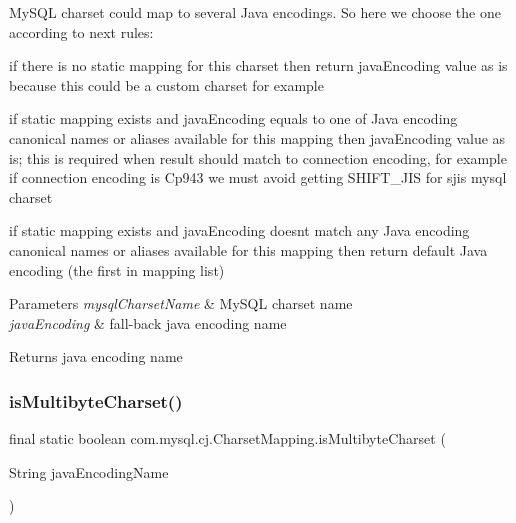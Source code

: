 My\+S\+QL charset could map to several Java encodings. So here we choose the one according to next rules\+: 
\begin{DoxyItemize}
\item if there is no static mapping for this charset then return java\+Encoding value as is because this could be a custom charset for example 
\item if static mapping exists and java\+Encoding equals to one of Java encoding canonical names or aliases available for this mapping then java\+Encoding value as is; this is required when result should match to connection encoding, for example if connection encoding is Cp943 we must avoid getting S\+H\+I\+F\+T\+\_\+\+J\+IS for sjis mysql charset 
\item if static mapping exists and java\+Encoding doesn\textquotesingle{}t match any Java encoding canonical names or aliases available for this mapping then return default Java encoding (the first in mapping list) 
\end{DoxyItemize}


\begin{DoxyParams}{Parameters}
{\em mysql\+Charset\+Name} & My\+S\+QL charset name \\
\hline
{\em java\+Encoding} & fall-\/back java encoding name \\
\hline
\end{DoxyParams}
\begin{DoxyReturn}{Returns}
java encoding name 
\end{DoxyReturn}
\mbox{\label{classcom_1_1mysql_1_1cj_1_1_charset_mapping_a391d1057e001d901ed4a4b4170513f31}} 
\subsubsection{\texorpdfstring{is\+Multibyte\+Charset()}{isMultibyteCharset()}}
{\footnotesize\ttfamily final static boolean com.\+mysql.\+cj.\+Charset\+Mapping.\+is\+Multibyte\+Charset (\begin{DoxyParamCaption}\item[{String}]{java\+Encoding\+Name }\end{DoxyParamCaption})\hspace{0.3cm}{\ttfamily [static]}}

